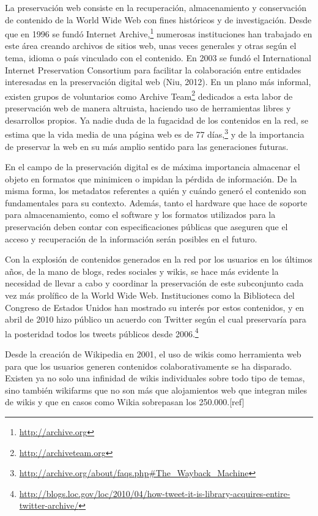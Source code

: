 \documentclass[11pt,twocolumn]{article}
\begin{document}
La preservación web consiste en la recuperación, almacenamiento y conservación de contenido de la World Wide Web con fines históricos y de investigación. Desde que en 1996 se fundó Internet Archive,\footnote{\href{http://archive.org}{http://archive.org}} numerosas instituciones han trabajado en este área creando archivos de sitios web, unas veces generales y otras según el tema, idioma o país vinculado con el contenido. En 2003 se fundó el International Internet Preservation Consortium para facilitar la colaboración entre entidades interesadas en la preservación digital web (Niu, 2012). En un plano más informal, existen grupos de voluntarios como Archive Team\footnote{\href{http://archiveteam.org}{http://archiveteam.org}} dedicados a esta labor de preservación web de manera altruista, haciendo uso de herramientas libres y desarrollos propios. Ya nadie duda de la fugacidad de los contenidos en la red, se estima que la vida media de una página web es de 77 días,\footnote{\href{http://archive.org/about/faqs.php\#The_Wayback_Machine}{http://archive.org/about/faqs.php\#The\_Wayback\_Machine}} y de la importancia de preservar la web en su más amplio sentido para las generaciones futuras.

En el campo de la preservación digital es de máxima importancia almacenar el objeto en formatos que minimicen o impidan la pérdida de información. De la misma forma, los metadatos referentes a quién y cuándo generó el contenido son fundamentales para su contexto. Además, tanto el hardware que hace de soporte para almacenamiento, como el software y los formatos utilizados para la preservación deben contar con especificaciones públicas que aseguren que el acceso y recuperación de la información serán posibles en el futuro.

Con la explosión de contenidos generados en la red por los usuarios en los últimos años, de la mano de blogs, redes sociales y wikis, se hace más evidente la necesidad de llevar a cabo y coordinar la preservación de este subconjunto cada vez más prolífico de la World Wide Web. Instituciones como la Biblioteca del Congreso de Estados Unidos han mostrado su interés por estos contenidos, y en abril de 2010 hizo público un acuerdo con Twitter según el cual preservaría para la posteridad todos los tweets públicos desde 2006.\footnote{\href{http://blogs.loc.gov/loc/2010/04/how-tweet-it-is-library-acquires-entire-twitter-archive/}{http://blogs.loc.gov/loc/2010/04/how-tweet-it-is-library-acquires-entire-twitter-archive/}}

Desde la creación de Wikipedia en 2001, el uso de wikis como herramienta web para que los usuarios generen contenidos colaborativamente se ha disparado. Existen ya no solo una infinidad de wikis individuales sobre todo tipo de temas, sino también wikifarms que no son más que alojamientos web que integran miles de wikis y que en casos como Wikia sobrepasan los 250.000.[ref]
\end{document}
